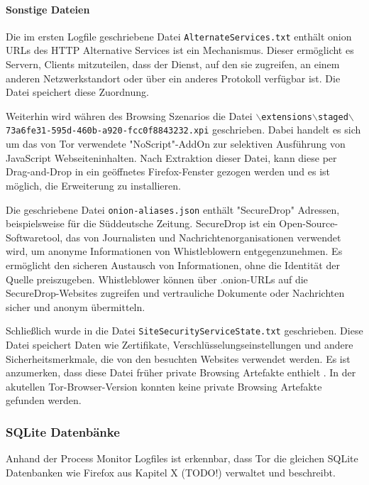 \paragraph*{Sonstige Dateien}
Die im ersten Logfile geschriebene Datei \texttt{AlternateServices.txt}
enthält onion URLs des HTTP Alternative Services ist ein Mechanismus. Dieser ermöglicht es Servern, Clients mitzuteilen, dass der Dienst, auf den sie zugreifen, an einem anderen Netzwerkstandort oder über ein anderes Protokoll verfügbar ist. Die Datei speichert diese Zuordnung.

Weiterhin wird währen des Browsing Szenarios die Datei \texttt{$\backslash$extensions$\backslash$staged$\backslash${73a6fe31-595d-460b-a920-fcc0f8843232}.xpi} geschrieben. Dabei handelt es sich um das von Tor verwendete "NoScript"-AddOn zur selektiven Ausführung von JavaScript Webseiteninhalten.
Nach Extraktion dieser Datei, kann diese per Drag-and-Drop in ein geöffnetes Firefox-Fenster gezogen werden und es ist möglich, die Erweiterung zu installieren.

Die geschriebene Datei \texttt{onion-aliases.json} enthält "SecureDrop" Adressen, beispielsweise für die Süddeutsche Zeitung.  %
SecureDrop ist ein Open-Source-Softwaretool, das von Journalisten und Nachrichtenorganisationen verwendet wird, um anonyme Informationen von Whistleblowern entgegenzunehmen. Es ermöglicht den sicheren Austausch von Informationen, ohne die Identität der Quelle preiszugeben. Whistleblower können über .onion-URLs auf die SecureDrop-Websites zugreifen und vertrauliche Dokumente oder Nachrichten sicher und anonym übermitteln.


Schließlich wurde in die Datei \texttt{SiteSecurityServiceState.txt} geschrieben.
Diese Datei speichert Daten wie Zertifikate, Verschlüsselungseinstellungen und andere Sicherheitsmerkmale, die von den besuchten Websites verwendet werden.
Es ist anzumerken, dass diese Datei früher private Browsing Artefakte enthielt %
. In der akutellen Tor-Browser-Version konnten keine private Browsing Artefakte gefunden werden.
	
\subsubsection*{SQLite Datenbänke} 
Anhand der Process Monitor Logfiles ist erkennbar, dass Tor die gleichen SQLite Datenbanken wie Firefox aus Kapitel X (TODO!) verwaltet und beschreibt.
			

